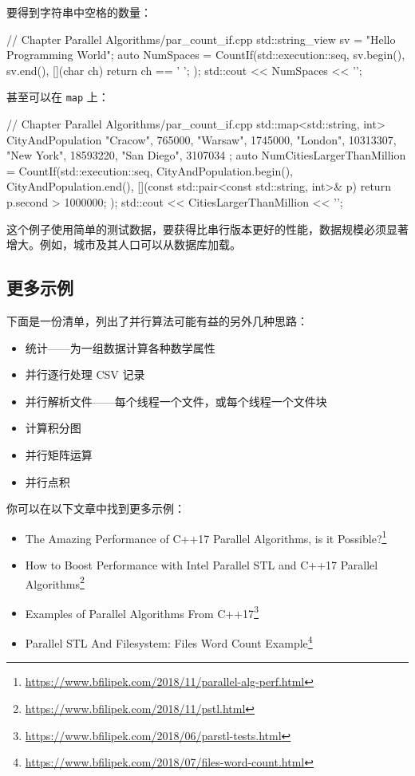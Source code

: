 要得到字符串中空格的数量：

\begin{codebox}[cpp]
// Chapter Parallel Algorithms/par_count_if.cpp
std::string_view sv = "Hello
Programming
World";
auto NumSpaces = CountIf(std::execution::seq, sv.begin(), sv.end(),
[](char ch) { return ch == ' '; }
);
std::cout << NumSpaces << '\n';
\end{codebox}

甚至可以在 \texttt{map} 上：

\begin{codebox}[cpp]
// Chapter Parallel Algorithms/par_count_if.cpp
std::map<std::string, int> CityAndPopulation{
{"Cracow", 765000},
{"Warsaw", 1745000},
{"London", 10313307},
{"New York", 18593220},
{"San Diego", 3107034}
};
auto NumCitiesLargerThanMillion = CountIf(std::execution::seq,
CityAndPopulation.begin(), CityAndPopulation.end(),
[](const std::pair<const std::string, int>& p) {
return p.second > 1000000;
}
);
std::cout << CitiesLargerThanMillion << '\n';
\end{codebox}

这个例子使用简单的测试数据，要获得比串行版本更好的性能，数据规模必须显著增大。例如，城市及其人口可以从数据库加载。


\subsection{更多示例}

下面是一份清单，列出了并行算法可能有益的另外几种思路：
\begin{itemize}
\item 统计——为一组数据计算各种数学属性
\item 并行逐行处理 CSV 记录
\item 并行解析文件——每个线程一个文件，或每个线程一个文件块
\item 计算积分图
\item 并行矩阵运算
\item 并行点积
\end{itemize}

你可以在以下文章中找到更多示例：
\begin{itemize}
\item The Amazing Performance of C++17 Parallel Algorithms, is it Possible?\footnote{\url{https://www.bfilipek.com/2018/11/parallel-alg-perf.html}}
\item How to Boost Performance with Intel Parallel STL and C++17 Parallel Algorithms\footnote{\url{https://www.bfilipek.com/2018/11/pstl.html}}
\item Examples of Parallel Algorithms From C++17\footnote{\url{https://www.bfilipek.com/2018/06/parstl-tests.html}}
\item Parallel STL And Filesystem: Files Word Count Example\footnote{\url{https://www.bfilipek.com/2018/07/files-word-count.html}}
\end{itemize}


